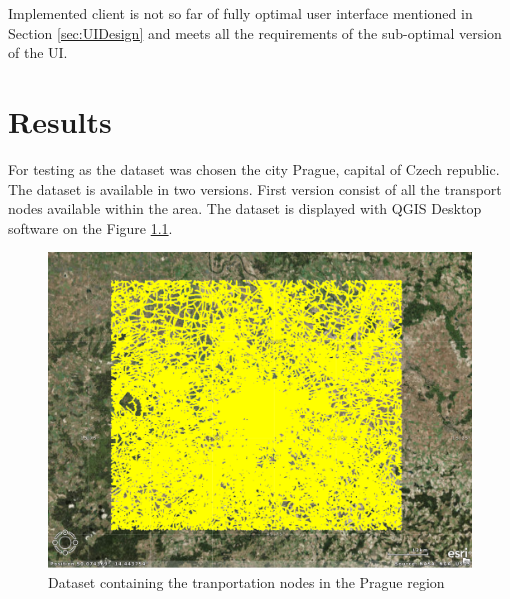 \documentclass[thesis=M,english]{FITthesis}[2012/10/20]
\begin{document}
Implemented client is not so far of fully optimal user interface mentioned in Section \ref{sec:UIDesign} and meets all the requirements of the sub-optimal version of the UI. 


\chapter{Results}
\label{ch:Results}

For testing as the dataset was chosen the city Prague, capital of Czech republic. The dataset is available in two versions. First version consist of all the transport nodes available within the area. 
The dataset is displayed with QGIS Desktop software on the Figure \ref{pic:dataset1}.
\begin{figure}[H]
\centering
\includegraphics[width=1\textwidth]{pics/praguedatasetL}
\caption{Dataset containing the tranportation nodes in the Prague region}
\label{pic:dataset1}
\end{figure}
\end{document}
